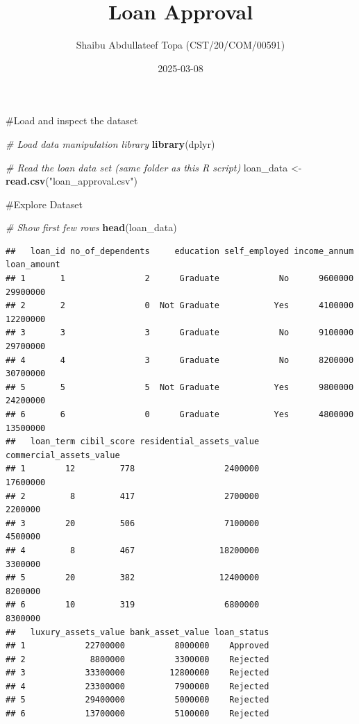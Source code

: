 \documentclass[
]{article}
\title{Loan Approval}
\author{Shaibu Abdullateef Topa (CST/20/COM/00591)}
\date{2025-03-08}
\newenvironment{Shaded}{\begin{snugshade}}{\end{snugshade}}
\newcommand{\CommentTok}[1]{\textcolor[rgb]{0.56,0.35,0.01}{\textit{#1}}}
\newcommand{\FunctionTok}[1]{\textcolor[rgb]{0.13,0.29,0.53}{\textbf{#1}}}
\newcommand{\NormalTok}[1]{#1}
\newcommand{\OtherTok}[1]{\textcolor[rgb]{0.56,0.35,0.01}{#1}}
\newcommand{\StringTok}[1]{\textcolor[rgb]{0.31,0.60,0.02}{#1}}
\begin{document}
\maketitle

\#Load and inspect the dataset

\begin{Shaded}
\begin{Highlighting}[]
\CommentTok{\# Load data manipulation library}
\FunctionTok{library}\NormalTok{(dplyr)}

\CommentTok{\# Read the loan data set (same folder as this R script)}
\NormalTok{loan\_data }\OtherTok{\textless{}{-}} \FunctionTok{read.csv}\NormalTok{(}\StringTok{"loan\_approval.csv"}\NormalTok{)}
\end{Highlighting}
\end{Shaded}

\#Explore Dataset

\begin{Shaded}
\begin{Highlighting}[]
\CommentTok{\# Show first few rows}
\FunctionTok{head}\NormalTok{(loan\_data)}
\end{Highlighting}
\end{Shaded}

\begin{verbatim}
##   loan_id no_of_dependents     education self_employed income_annum loan_amount
## 1       1                2      Graduate            No      9600000    29900000
## 2       2                0  Not Graduate           Yes      4100000    12200000
## 3       3                3      Graduate            No      9100000    29700000
## 4       4                3      Graduate            No      8200000    30700000
## 5       5                5  Not Graduate           Yes      9800000    24200000
## 6       6                0      Graduate           Yes      4800000    13500000
##   loan_term cibil_score residential_assets_value commercial_assets_value
## 1        12         778                  2400000                17600000
## 2         8         417                  2700000                 2200000
## 3        20         506                  7100000                 4500000
## 4         8         467                 18200000                 3300000
## 5        20         382                 12400000                 8200000
## 6        10         319                  6800000                 8300000
##   luxury_assets_value bank_asset_value loan_status
## 1            22700000          8000000    Approved
## 2             8800000          3300000    Rejected
## 3            33300000         12800000    Rejected
## 4            23300000          7900000    Rejected
## 5            29400000          5000000    Rejected
## 6            13700000          5100000    Rejected
\end{verbatim}
\end{document}
